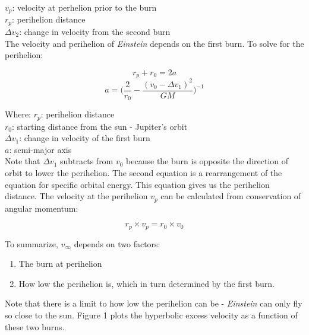 \documentclass[12pt]{article} %
\begin{document}
$v_p$: velocity at perhelion prior to the burn\\
$r_p$: perihelion distance\\
$\Delta v_2$: change in velocity from the second burn\\

The velocity and perihelion of \textit{Einstein} depends on the first burn. To solve for the perihelion:

$$r_p + r_0 = 2a$$
$$a = \bigg(\frac{2}{r_0} - \frac{(v_0-\Delta v_1)^2}{GM}\bigg)^{-1}$$

Where:
$r_p$: perihelion distance\\
$r_0$: starting distance from the sun - Jupiter's orbit\\
$\Delta v_1$: change in velocity of the first burn\\
$a$: semi-major axis\\

Note that $\Delta v_1$ subtracts from $v_0$ because the burn is opposite the direction of orbit to lower the perihelion. The second equation is a rearrangement of the equation for specific orbital energy. This equation gives us the perihelion distance. The velocity at the perihelion $v_p$ can be calculated from conservation of angular momentum:

$$r_p \times v_p = r_0 \times v_0$$

To summarize, $v_{\infty}$ depends on two factors: 

\begin{enumerate}
\item The burn at perihelion
\item How low the perihelion is, which in turn determined by the first burn. 
\end{enumerate}

Note that there is a limit to how low the perihelion can be - \textit{Einstein} can only fly so close to the sun. Figure 1 plots the hyperbolic excess velocity as a function of these two burns.
\end{document}
